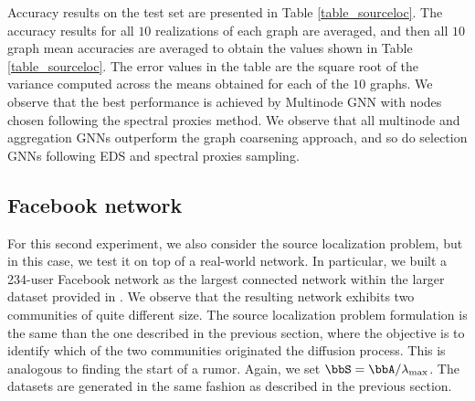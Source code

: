 Accuracy results on the test set are presented in Table \ref{table_sourceloc}. The accuracy results for all $10$ realizations of each graph are averaged, and then all $10$ graph mean accuracies are averaged to obtain the values shown in Table \ref{table_sourceloc}. The error values in the table are the square root of the variance computed across the means obtained for each of the $10$ graphs. We observe that the best performance is achieved by Multinode GNN with nodes chosen following the spectral proxies method. We observe that all multinode and aggregation GNNs outperform the graph coarsening approach, and so do selection GNNs following EDS and spectral proxies sampling.


\subsection{Facebook network} \label{subsec_fb}

For this second experiment, we also consider the source localization problem, but in this case, we test it on top of a real-world network. In particular, we built a 234-user Facebook network as the largest connected network within the larger dataset provided in \cite{mcauley12-fb}. We observe that the resulting network exhibits two communities of quite different size. The source localization problem formulation is the same than the one described in the previous section, where the objective is to identify which of the two communities originated the diffusion process. This is analogous to finding the start of a rumor. Again, we set $\bbS = \bbA/\lambda_{\max}$. The datasets are generated in the same fashion as described in the previous section.

